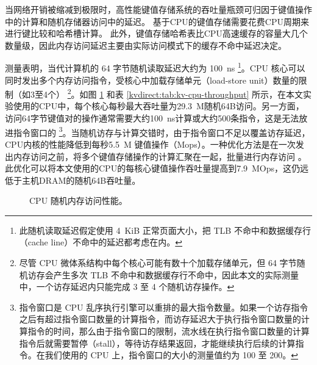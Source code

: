 \begin{figure*}[htbp]
	\centering
	\caption{键值存储数据通路和处理装置的设计空间。 行表示数据路径。 一个键值操作（细线）可能需要多个基于地址的存储器访问（粗线）。 黑框表示键值处理发生的位置。}
	\label{kvdirect:fig:memaccess}
\end{figure*}

当网络开销被缩减到极限时，高性能键值存储系统的吞吐量瓶颈可归因于键值操作中的计算和随机存储器访问中的延迟。
基于CPU的键值存储需要花费CPU周期来进行键比较和哈希槽计算。
此外，键值存储哈希表比CPU高速缓存的容量大几个数量级，因此内存访问延迟主要由实际访问模式下的缓存不命中延迟决定。


测量表明，当代计算机的 64 字节随机读取延迟大约为 100~ns \footnote{此随机读取延迟假定使用 4~KiB 正常页面大小，把 TLB 不命中和数据缓存行（cache line）不命中的延迟都考虑在内。}。CPU 核心可以同时发出多个内存访问指令，受核心中加载存储单元（load-store unit）数量的限制（如3至4个） \cite {gharachorloo1992hiding,han2010packetshader,zhang2015mega} \footnote{尽管 CPU 微体系结构中每个核心可能有数十个加载存储单元，但 64 字节随机访存会产生多次 TLB 不命中和数据缓存行不命中，因此本文的实际测量中，一个访存延迟内只能完成 3 至 4 个随机访存操作。}。如图 \ref{kvdirect:fig:cpu-mem} 和表 \ref{kvdirect:tab:kv-cpu-throughput} 所示，在本文实验使用的CPU中，每个核心每秒最大吞吐量为29.3~M随机64B访问。另一方面，访问64字节键值对的操作通常需要大约100~ns计算或大约500条指令，这是无法放进指令窗口的 \footnote{指令窗口是 CPU 乱序执行引擎可以重排的最大指令数量。如果一个访存指令之后有超过指令窗口数量的计算指令，而访存延迟大于执行指令窗口数量的计算指令的时间，那么由于指令窗口的限制，流水线在执行指令窗口数量的计算指令后就需要暂停（stall），等待访存结果返回，才能继续执行后续的计算指令。在我们使用的 CPU 上，指令窗口的大小的测量值约为 100 至 200。}。当随机访存与计算交错时，由于指令窗口不足以覆盖访存延迟，CPU内核的性能降低到每秒5.5~M 键值操作（Mops）。一种优化方法是在一次发出内存访问之前，将多个键值存储操作的计算汇聚在一起，批量进行内存访问 \cite {li2016full,narula2014phase}。此优化可以将本文使用的CPU的每核心键值操作吞吐量提高到7.9~MOps，这仍远低于主机DRAM的随机64B吞吐量。


\begin{figure}[htbp]
	\centering
	\caption{CPU 随机内存访问性能。}
	\label{kvdirect:fig:cpu-mem}
\end{figure}


